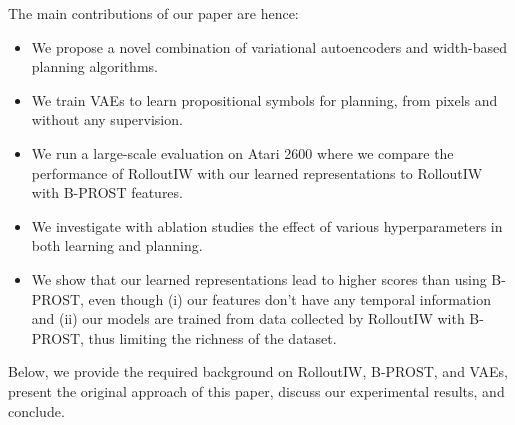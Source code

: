 The main contributions of our paper are hence:
\begin{itemize}
    \item We propose a novel combination of variational autoencoders and width-based planning algorithms.
    \item We train VAEs to learn propositional symbols for planning, from pixels and without any supervision.
    \item We run a large-scale evaluation on Atari 2600 where we compare the performance of RolloutIW with our learned representations to RolloutIW with B-PROST features.
    \item We investigate with ablation studies the effect of various hyperparameters in both learning and planning.
    \item We show that our learned representations lead to higher scores than using B-PROST, even though (i) our features don't have any temporal information and (ii) our models are trained from data collected by RolloutIW with B-PROST, thus limiting the richness of the dataset.
\end{itemize}
Below, we provide the required background on RolloutIW, B-PROST, and VAEs, present the original approach of this paper, discuss our experimental results, and conclude.
